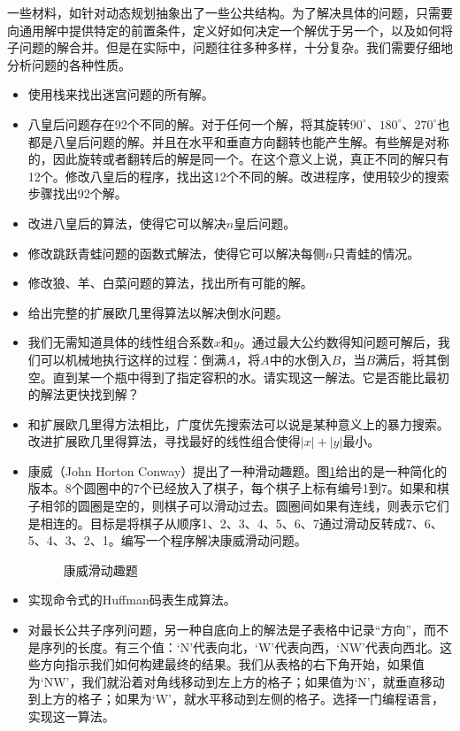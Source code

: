 \documentclass[b5paper]{ctexart}
\begin{document}
一些材料，如\cite{algo-fp}针对动态规划抽象出了一些公共结构。为了解决具体的问题，只需要向通用解中提供特定的前置条件，定义好如何决定一个解优于另一个，以及如何将子问题的解合并。但是在实际中，问题往往多种多样，十分复杂。我们需要仔细地分析问题的各种性质。

\begin{Exercise}
\begin{itemize}
\item 使用栈来找出迷宫问题的所有解。
\item 八皇后问题存在92个不同的解。对于任何一个解，将其旋转$90^{\circ}$、$180^{\circ}$、$270^{\circ}$也都是八皇后问题的解。并且在水平和垂直方向翻转也能产生解。有些解是对称的，因此旋转或者翻转后的解是同一个。在这个意义上说，真正不同的解只有12个。修改八皇后的程序，找出这12个不同的解。改进程序，使用较少的搜索步骤找出92个解。
\item 改进八皇后的算法，使得它可以解决$n$皇后问题。
\item 修改跳跃青蛙问题的函数式解法，使得它可以解决每侧$n$只青蛙的情况。
\item 修改狼、羊、白菜问题的算法，找出所有可能的解。
\item 给出完整的扩展欧几里得算法以解决倒水问题。
\item 我们无需知道具体的线性组合系数$x$和$y$。通过最大公约数得知问题可解后，我们可以机械地执行这样的过程：倒满$A$，将$A$中的水倒入$B$，当$B$满后，将其倒空。直到某一个瓶中得到了指定容积的水。请实现这一解法。它是否能比最初的解法更快找到解？
\item 和扩展欧几里得方法相比，广度优先搜索法可以说是某种意义上的暴力搜索。改进扩展欧几里得算法，寻找最好的线性组合使得$|x| + |y|$最小。
\item 康威（John Horton Conway）提出了一种滑动趣题。图\ref{fig:conway7}给出的是一种简化的版本。8个圆圈中的7个已经放入了棋子，每个棋子上标有编号1到7。如果和棋子相邻的圆圈是空的，则棋子可以滑动过去。圆圈间如果有连线，则表示它们是相连的。目标是将棋子从顺序1、2、3、4、5、6、7通过滑动反转成7、6、5、4、3、2、1。编写一个程序解决康威滑动问题。
\begin{figure}[htbp]
 \centering
 
 \caption{康威滑动趣题}
 \label{fig:conway7}
\end{figure}
\item 实现命令式的Huffman码表生成算法。
\item 对最长公共子序列问题，另一种自底向上的解法是子表格中记录“方向”，而不是序列的长度。有三个值：‘N’代表向北，‘W’代表向西，‘NW’代表向西北。这些方向指示我们如何构建最终的结果。我们从表格的右下角开始，如果值为‘NW’，我们就沿着对角线移动到左上方的格子；如果值为‘N’，就垂直移动到上方的格子；如果为‘W’，就水平移动到左侧的格子。选择一门编程语言，实现这一算法。

\end{itemize}
\end{Exercise}
\end{document}

